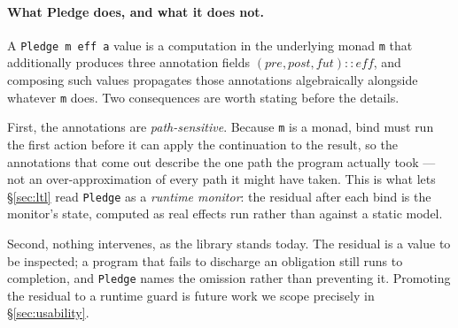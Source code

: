 \documentclass[acmsmall,screen]{acmart}
\newcommand{\pre}{\mathit{pre}}
\newcommand{\post}{\mathit{post}}
\newcommand{\fut}{\mathit{fut}}
\begin{document}
\paragraph{What Pledge does, and what it does not.}
A \lstinline{Pledge m eff a} value is a computation in the underlying monad
\lstinline{m} that additionally produces three annotation fields
$(\pre, \post, \fut) :: \mathit{eff}$, and composing such values propagates
those annotations algebraically alongside whatever \lstinline{m} does.
Two consequences are worth stating before the details.

First, the annotations are \emph{path-sensitive}.
Because \lstinline{m} is a monad, bind must run the first action before it
can apply the continuation to the result, so the annotations that come out
describe the one path the program actually took --- not an
over-approximation of every path it might have taken.
This is what lets \S\ref{sec:ltl} read \lstinline{Pledge} as a
\emph{runtime monitor}: the residual after each bind is the monitor's state,
computed as real effects run rather than against a static model.

Second, nothing intervenes, as the library stands today.
The residual is a value to be inspected; a program that fails to discharge
an obligation still runs to completion, and \lstinline{Pledge} names the
omission rather than preventing it.
Promoting the residual to a runtime guard is future work we scope precisely
in \S\ref{sec:usability}.
\end{document}
